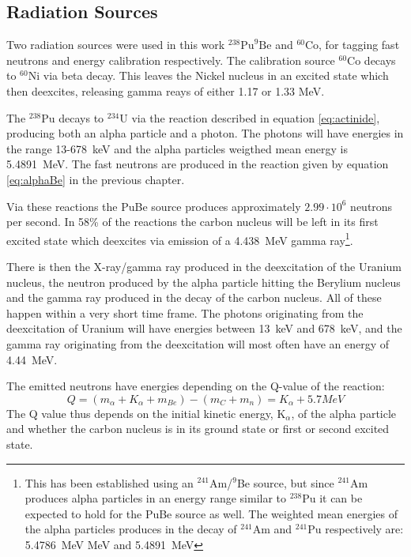 \documentclass[main.tex]{subfiles}
\begin{document}
\subsection{Radiation Sources}
Two radiation sources were used in this work $^\text{238}\text{Pu}^\text{9}\text{Be}$ and $^\text{60}\text{Co}$, for tagging fast neutrons and energy calibration respectively. The calibration source $^\text{60}\text{Co}$ decays to $^\text{60}\text{Ni}$ via beta decay. This leaves the Nickel nucleus in an excited state which then deexcites, releasing gamma reays of either 1.17 or 1.33 MeV\cite{Nudat}.


The $^\textrm{238}$Pu decays to $^\textrm{234}$U via the reaction described in equation \ref{eq:actinide}, producing both an alpha particle and a photon. The photons will have energies in the range 13-\SI{678}{\keV}\cite{Nudat} and the alpha particles weigthed mean energy is \SI{5.4891}{\mega\eV}\cite{Scherzinger:2017}. The fast neutrons are produced in the reaction given by equation \ref{eq:alphaBe} in the previous chapter.

Via these reactions the PuBe source produces approximately $\text{2.99}\cdot\text{10}^\text{6}$ neutrons per second\cite{Scherzinger:2017}. In 58\% of the reactions the carbon nucleus will be left in its first excited state which deexcites via emission of a \SI{4.438}{\mega\eV} gamma ray\cite{Scherzinger:2015}\footnote{This has been established using an $^\text{241}$Am/$^\text{9}$Be source, but since $^\text{241}$Am produces alpha particles in an energy range similar to $^\text{238}$Pu it can be expected to hold for the PuBe source as well. The weighted mean energies of the alpha particles produces in the decay of $^\text{241}$Am and $^\text{241}$Pu respectively are: \SI{5.4786}{\mega\eV} MeV and \SI{5.4891}{\mega\eV}\cite{Scherzinger:2017}}.

There is then the X-ray/gamma ray produced in the deexcitation of the Uranium nucleus, the neutron produced by the alpha particle hitting the Berylium nucleus and the gamma ray produced in the decay of the carbon nucleus. All of these happen within a very short time frame. The photons originating from the deexcitation of Uranium will have energies between \SI{13}{\keV} and \SI{678}{\keV}, and the gamma ray originating from the deexcitation will most often have an energy of \SI{4.44}{MeV}.

The emitted neutrons have energies depending on the Q-value of the reaction:
$$Q = (m_\alpha + K_\alpha + m_{Be}) - (m_{C} + m_n) = K_\alpha + 5.7 MeV$$
The Q value thus depends on the initial kinetic energy, K$_\alpha$, of the alpha particle and whether the carbon nucleus is in its ground state or first or second excited state. 
\end{document}
